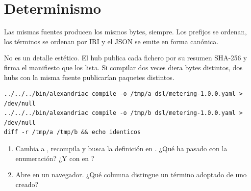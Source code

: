 \section{Determinismo}

Las mismas fuentes producen los mismos bytes, siempre. Los prefijos se ordenan, los términos se ordenan por IRI
y el JSON se emite en forma canónica.

No es un detalle estético. El hub publica cada fichero por su resumen SHA-256 y firma el manifiesto que los
lista. Si compilar dos veces diera bytes distintos, dos hubs con la misma fuente publicarían paquetes distintos.

\begin{lstlisting}[style=sh]
../../../bin/alexandriac compile -o /tmp/a dsl/metering-1.0.0.yaml > /dev/null
../../../bin/alexandriac compile -o /tmp/b dsl/metering-1.0.0.yaml > /dev/null
diff -r /tmp/a /tmp/b && echo identicos
\end{lstlisting}

\begin{retos}
\begin{enumerate}[leftmargin=*, itemsep=2pt]
  \item Cambia  a , recompila y busca la definición  en
        . ¿Qué ha pasado con la enumeración? ¿Y con  en ?
  \item Abre  en un navegador. ¿Qué columna distingue un término adoptado de uno creado?
\end{enumerate}
\end{retos}
